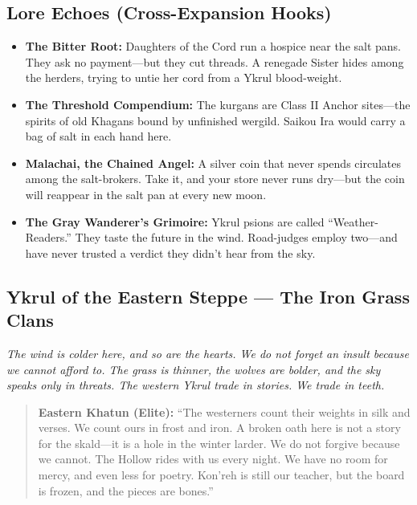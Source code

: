 \subsection{Lore Echoes (Cross-Expansion Hooks)}
\label{sec:ykrul-lore}
\begin{itemize}[nosep]
  \item \textbf{The Bitter Root:} Daughters of the Cord run a hospice near the salt pans. They ask no payment---but they cut threads. A renegade Sister hides among the herders, trying to untie her cord from a Ykrul blood-weight.
  \item \textbf{The Threshold Compendium:} The kurgans are Class II Anchor sites---the spirits of old Khagans bound by unfinished wergild. Saikou Ira would carry a bag of salt in each hand here.
  \item \textbf{Malachai, the Chained Angel:} A silver coin that never spends circulates among the salt-brokers. Take it, and your store never runs dry---but the coin will reappear in the salt pan at every new moon.
  \item \textbf{The Gray Wanderer's Grimoire:} Ykrul psions are called ``Weather-Readers.'' They taste the future in the wind. Road-judges employ two---and have never trusted a verdict they didn't hear from the sky.
\end{itemize}

\subsection{Ykrul of the Eastern Steppe --- The Iron Grass Clans}
\label{sec:ykrul-east}

\emph{The wind is colder here, and so are the hearts. We do not forget an insult because we cannot afford to. The grass is thinner, the wolves are bolder, and the sky speaks only in threats. The western Ykrul trade in stories. We trade in teeth.}

\begin{quote}
  \textbf{Eastern Khatun (Elite):}  
  ``The westerners count their weights in silk and verses. We count ours in frost and iron. A broken oath here is not a story for the skald---it is a hole in the winter larder. We do not forgive because we cannot. The Hollow rides with us every night. We have no room for mercy, and even less for poetry. Kon'reh is still our teacher, but the board is frozen, and the pieces are bones.''
\end{quote}

